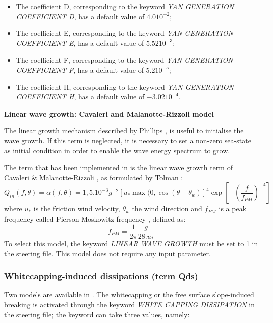 \begin{itemize}
\item  The coefficient D, corresponding to the keyword \textit{YAN GENERATION COEFFICIENT D}, has a default value of $4.0 10^{-2}$;
\item  The coefficient E, corresponding to the keyword \textit{YAN GENERATION COEFFICIENT E}, has a default value of $5.52 10^{-3}$;
\item  The coefficient F, corresponding to the keyword \textit{YAN GENERATION COEFFICIENT F}, has a default value of $5.2 10^{-5}$;
\item  The coefficient H, corresponding to the keyword \textit{YAN GENERATION COEFFICIENT H}, has a default value of $-3.02 10^{-4}$.
\end{itemize}


{\bf  Linear wave growth: Cavaleri and Malanotte-Rizzoli model}

 The linear growth mechanism described by Phillips \cite{Phillips1957}, \cite{Phillips1958} is useful to initialise the wave growth. If this term is neglected, it is necessary to set a non-zero sea-state as initial condition in order to enable the wave energy spectrum to grow.

 The term that has been implemented in \tomawac is the linear wave growth term of Cavaleri \& Malanotte-Rizzoli \cite{Cavaleri1981}, as formulated by Tolman \cite{Tolman1992}:
\begin{equation} \label{GrindEQ__4_35_}
Q_{in} (f,\theta )=\alpha (f,\theta )=1,5.10^{-3} g^{-2} \left[u_{*} \max (0,\cos \left(\theta -\theta _{w} \right)\right]^{4} \exp \left[-\left(\frac{f}{f_{PM} } \right)^{-4} \right]
\end{equation}
where $u_{*}$ is the friction wind velocity, ${\theta}_{w}$ the wind direction and ${f}_{PM}$ is a peak frequency called Pierson-Moskowitz frequency \cite{Pierson1964}, defined as:
\begin{equation} \label{GrindEQ__4_36_}
f_{PM} =\frac{1}{2\pi } \frac{g}{28.u_{*} }
\end{equation}
To select this model, the keyword \textit{LINEAR WAVE GROWTH} must be set to 1 in the steering file. This model does not require any input parameter.

\subsubsection{ Whitecapping-induced dissipations (term Qds)}

 Two models are available in \tomawac. The whitecapping or the free surface slope-induced breaking is activated through the keyword \textit{WHITE CAPPING DISSIPATION} in the steering file; the keyword can take three values, namely:

